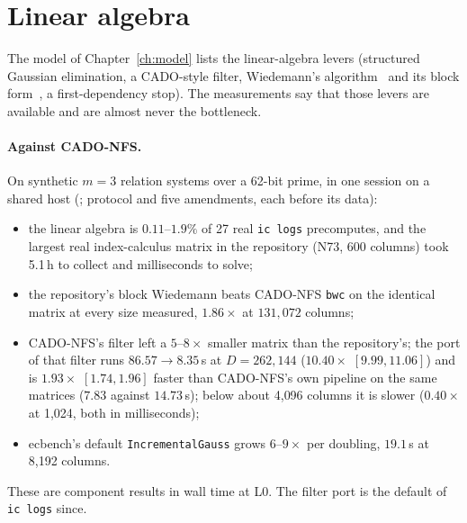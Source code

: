 \section{Linear algebra}\label{sec:in-la}

The model of Chapter~\ref{ch:model} lists the linear-algebra levers
(structured Gaussian elimination, a CADO-style filter, Wiedemann's
algorithm~\cite{wiedemann1986} and its block form~\cite{coppersmith1994}, a
first-dependency stop). The measurements say that those levers are
available and are almost never the bottleneck.

\paragraph{Against CADO-NFS.} On synthetic $m=3$ relation systems over a
62-bit prime, in one session on a shared host
(; protocol and five amendments,
each before its data):
\begin{itemize}
\item the linear algebra is $0.11$--$1.9\%$ of 27 real \texttt{ic logs}
  precomputes, and the largest real index-calculus matrix in the repository
  (N73, 600 columns) took 5.1\,h to collect and milliseconds to solve;
\item the repository's block Wiedemann beats CADO-NFS \texttt{bwc} on the
  identical matrix at every size measured, $1.86\times$ at $131{,}072$ columns;
\item CADO-NFS's filter left a $5$--$8\times$ smaller matrix than the
  repository's; the port of that filter runs $86.57\to8.35$\,s at
  $D=262{,}144$ ($10.40\times$ $[9.99,11.06]$) and is $1.93\times$
  $[1.74,1.96]$ faster than CADO-NFS's own pipeline on the same matrices
  ($7.83$ against $14.73$\,s); below about 4{,}096 columns it is slower
  ($0.40\times$ at 1{,}024, both in milliseconds);
\item ecbench's default \texttt{IncrementalGauss} grows $6$--$9\times$ per
  doubling, $19.1$\,s at 8{,}192 columns.
\end{itemize}
These are component results in wall time at L0. The filter port is the
default of \texttt{ic logs} since.

